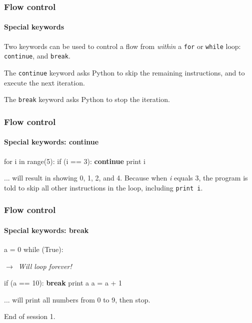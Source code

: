 \documentclass[handout]{beamer}
\newcommand{\comment}[1]{{\raggedright $\rightarrow$~\textit{\textsf{#1}}}}
\begin{document}
\begin{frame}
	\frametitle{Flow control}
	\framesubtitle{Special keywords}

	Two keywords can be used to control a flow from \textit{within} a \texttt{for} or \texttt{while} loop: \texttt{continue}, and \texttt{break}.

	\pause
	\bigskip
	The \texttt{continue} keyword asks Python to skip the remaining instructions, and to execute the next iteration.

	\pause
	\bigskip
	The \texttt{break} keyword asks Python to stop the iteration.
\end{frame}

\begin{frame}[fragile]
	\frametitle{Flow control}
	\framesubtitle{Special keywords: continue}

	\begin{semiverbatim}
		for i in range(5):
		  if (i == 3):
		    \textbf{continue}
		  print i
	\end{semiverbatim}

	... will result in showing 0, 1, 2, and 4. Because when \textit{i} equals 3, the program is told to skip all other instructions in the loop, including \texttt{print i}.
\end{frame}

\begin{frame}[fragile]
	\frametitle{Flow control}
	\framesubtitle{Special keywords: break}

	\begin{semiverbatim}
		a = 0
		while (True): \comment{Will loop forever!}
		  if (a == 10):
		    \textbf{break}
		  print a
		  a = a + 1
	\end{semiverbatim}

	... will print all numbers from 0 to 9, then stop.
\end{frame}

\begin{frame}
	End of session 1.
\end{frame}
\end{document}
